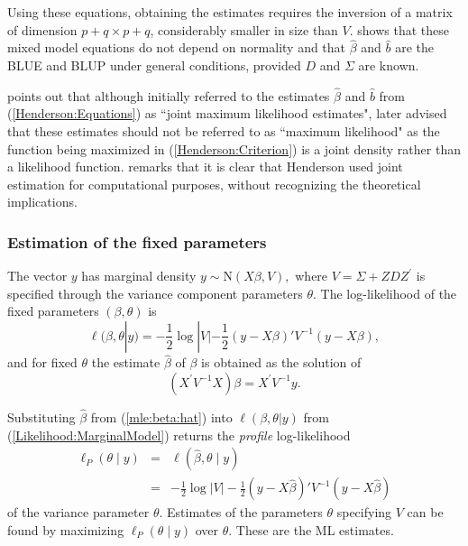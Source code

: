 \documentclass[12pt, a4paper]{article}
\theoremstyle{plain}
\theoremstyle{definition}
\theoremstyle{remark}
\begin{document}
Using these equations, obtaining the estimates requires the inversion of a matrix
of dimension $p+q \times p+q$, considerably smaller in size than $V$. \citet{Henderson1963} shows that these mixed model equations do not depend on normality and that $\hat{\beta}$ and $\hat{b}$ are the BLUE and BLUP under general conditions, provided $D$ and $\Sigma$ are known.

\cite{Robi:BLUP:1991} points out that although \cite{Henderson:1950} initially referred to the estimates $\hat{\beta}$ and $\hat{b}$ from (\ref{Henderson:Equations}) as ``joint maximum likelihood estimates", \cite{Henderson:1973} later advised that these estimates should not be referred to as ``maximum likelihood" as the function being maximized in (\ref{Henderson:Criterion}) is a joint density rather than a likelihood function. \cite{Lee:Neld:Pawi:2006} remarks that it is clear that Henderson used joint estimation for computational purposes, without recognizing the theoretical implications.

\subsubsection{Estimation of the fixed parameters}

The vector $y$ has marginal density $y \sim \mathrm{N}(X \beta,V),$ where $V = \Sigma + ZDZ^\prime$ is specified through the variance component parameters $\theta.$ The log-likelihood of the fixed parameters $(\beta, \theta)$ is
\begin{equation}
\ell (\beta, \theta|y) =
-\frac{1}{2} \log |V| -\frac{1}{2}(y -
X \beta)'V^{-1}(y -
X \beta), \label{Likelihood:MarginalModel}
\end{equation}
and for fixed $\theta$ the estimate $\hat{\beta}$ of $\beta$ is obtained as the solution of
\begin{equation}
(X^\prime V^{-1}X) {\beta} = X^\prime V^{-1}y.
\label{mle:beta:hat}
\end{equation}

Substituting $\hat{\beta}$ from (\ref{mle:beta:hat}) into $\ell(\beta, \theta|y)$ from (\ref{Likelihood:MarginalModel}) returns the \emph{profile} log-likelihood
\begin{eqnarray*}
\ell_P(\theta \mid y) &=& \ell(\hat{\beta}, \theta \mid y) \\
&=& -\frac{1}{2} \log |V| -\frac{1}{2}(y - X \hat{\beta})'V^{-1}(y - X \hat{\beta})
\end{eqnarray*}
of the variance parameter $\theta.$ Estimates of the parameters $\theta$ specifying $V$ can be found by maximizing $\ell_P(\theta \mid y)$ over $\theta.$ These are the ML estimates.
\end{document}
